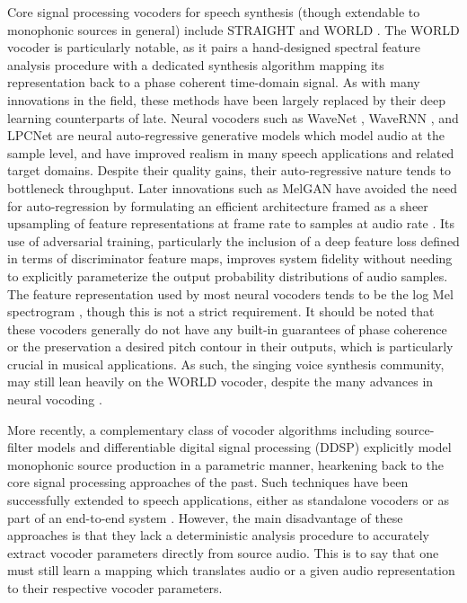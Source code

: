 \documentclass{article}
\begin{document}
\begin{sloppy}
Core signal processing vocoders for speech synthesis (though extendable to monophonic sources in general) include STRAIGHT and WORLD \cite{WORLD}.  The WORLD vocoder is particularly notable, as it pairs a hand-designed spectral feature analysis procedure with a dedicated synthesis algorithm mapping its representation back to a phase coherent time-domain signal.  As with many innovations in the field, these methods have been largely replaced by their deep learning counterparts of late.  Neural vocoders such as WaveNet \cite{WaveNet}, WaveRNN \cite{WaveRnn}, and LPCNet \cite{LPCNet} are neural auto-regressive generative models which model audio at the sample level, and have improved realism in many speech applications and related target domains.  Despite their quality gains, their auto-regressive nature tends to bottleneck throughput.  Later innovations such as MelGAN have avoided the need for auto-regression by formulating an efficient architecture framed as a sheer upsampling of feature representations at frame rate to samples at audio rate \cite{MelGAN}.  Its use of adversarial training, particularly the inclusion of a deep feature loss defined in terms of discriminator feature maps, improves system fidelity without needing to explicitly parameterize the output probability distributions of audio samples.  The feature representation used by most neural vocoders tends to be the log Mel spectrogram \cite{Tacotron}, though this is not a strict requirement.  It should be noted that these vocoders generally do not have any built-in guarantees of phase coherence or the preservation a desired pitch contour in their outputs, which is particularly crucial in musical applications. As such, the singing voice synthesis community, may still lean heavily on the WORLD vocoder, despite the many advances in neural vocoding \cite{SingingSynthesis, WganSing}.

More recently, a complementary class of vocoder algorithms including source-filter models \cite{Nsf2} and differentiable digital signal processing (DDSP) \cite{Ddsp} explicitly model monophonic source production in a parametric manner, hearkening back to the core signal processing approaches of the past.  Such techniques have been successfully extended to speech applications, either as standalone vocoders \cite{HooliGan, Ddspeech} or as part of an end-to-end system \cite{Shahan3}.  However, the main disadvantage of these approaches is that they lack a deterministic analysis procedure to accurately extract vocoder parameters directly from source audio.  This is to say that one must still learn a mapping which translates audio or a given audio representation to their respective vocoder parameters.


\end{sloppy}
\end{document}
